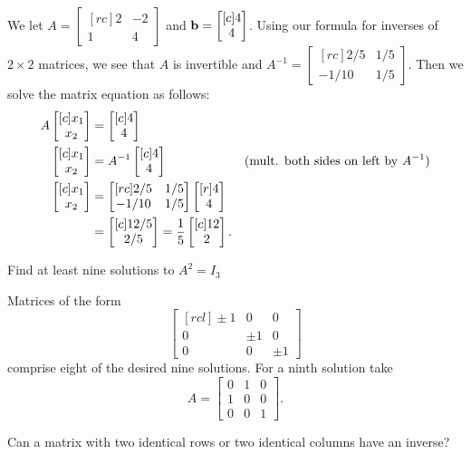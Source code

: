 \begin{solution}
We let $A=\begin{bmatrix}[rc]
2&-2\\
1&4
\end{bmatrix}$ and ${\mathbf b}=\begin{bmatrix}[c] 4 \\ 4 \end{bmatrix}$. Using our formula for inverses of $2\times 2$ matrices, we see that $A$ is invertible and $A^{-1}=\begin{bmatrix}[rc]
2/5&1/5\\
-1/10&1/5
\end{bmatrix}$. 
Then we solve the matrix equation as follows:
\begin{align*}
A\begin{bmatrix}[c] x_1\\ x_2 \end{bmatrix}&=\begin{bmatrix}[c] 4 \\4 \end{bmatrix}\\
\begin{bmatrix}[c] x_1\\ x_2 \end{bmatrix}&=A^{-1}\begin{bmatrix}[c] 4 \\4 \end{bmatrix} &\text{(mult. both sides on left by $A^{-1}$)}\\
\begin{bmatrix}[c] x_1\\ x_2 \end{bmatrix}&=
\begin{bmatrix}[rc]
2/5&1/5\\
-1/10&1/5
\end{bmatrix}
\begin{bmatrix}[r]
4\\
4
\end{bmatrix}\\
&=\begin{bmatrix}[c] 12/5 \\ 2/5 \end{bmatrix}=\frac{1}{5}\begin{bmatrix}[c] 12\\ 2 \end{bmatrix}.
\end{align*}
\end{solution}
\ii Find at least nine solutions to $A^2 = I_3$
\\
\begin{solution}
Matrices of the form 
\[
\begin{bmatrix}[rcl]
\pm 1&0&0\\
0&\pm 1&0\\
0&0&\pm 1
\end{bmatrix}
\]
comprise eight of the desired nine solutions. For a ninth solution take 
\[
A=\begin{bmatrix}
0&1&0\\
1&0&0\\
0&0&1
\end{bmatrix}.
\]

\end{solution}
\ii Can a matrix with two identical rows or two identical columns have an inverse?
